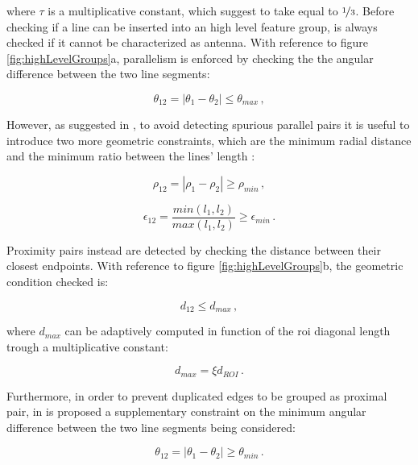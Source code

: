 where $\tau$ is a multiplicative constant, which \cite{Sharma2018} suggest to take equal to $\nicefrac{1}{3}$. Before checking if a line can be inserted into an high level feature group, is always checked if it cannot be characterized as antenna.
With reference to figure \ref{fig:highLevelGroups}a, parallelism is enforced by checking the the angular difference between the two line segments:

\begin{equation}
  \theta_{12} = |\theta_1 - \theta_2| \leqslant \theta_{max} \,,
\end{equation}

However, as suggested in \cite{fracchio2019}, to avoid detecting spurious parallel pairs it is useful to introduce two more geometric constraints, which are the minimum radial distance and the minimum ratio between the lines' length :

\begin{equation}
  \rho_{12} = |\rho_1 - \rho_2| \geq  \rho_{min} \,,
\end{equation}

\begin{equation}
  \epsilon_{12} = \frac{min(l_1,l_2)}{max(l_1,l_2)} \geq \epsilon_{min} \,.
\end{equation}

Proximity pairs instead are detected by checking the distance between their closest endpoints. With reference to figure  \ref{fig:highLevelGroups}b, the geometric condition checked is:

\begin{equation}
  d_{12} \leqslant d_{max} \,,
\end{equation}

where $d_{max}$ can be adaptively computed in function of the \acrshort{roi} diagonal length trough a multiplicative constant:

\begin{equation}
  d_{max} = \xi d_{ROI} \,.
\end{equation}

Furthermore, in order to prevent duplicated edges to be grouped as proximal pair, in \cite{fracchio2019} is proposed a supplementary constraint on the minimum angular difference between the two line segments being considered:

\begin{equation}
  \theta_{12} = |\theta_1 - \theta_2| \geq \theta_{min} \,.
\end{equation}

